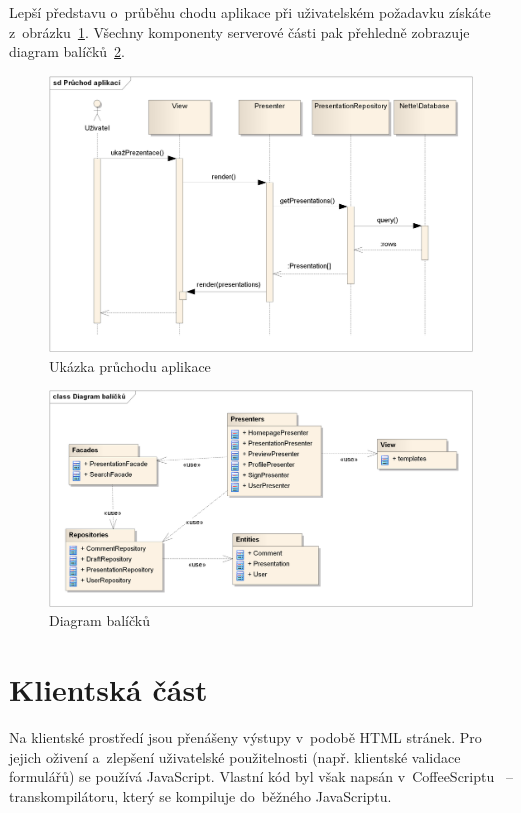 \documentclass[11pt,twoside,a4paper]{book}
\begin{document}
Lepší představu o~průběhu chodu aplikace při uživatelském požadavku získáte z~obrázku~\ref{fig:logika}. Všechny komponenty serverové části pak přehledně zobrazuje diagram balíčků~\ref{fig:balicky}.


\begin{figure}[ht]
	\begin{center}
		\includegraphics[width=14cm]{PRO-img/logika.png}
		\caption{Ukázka průchodu aplikace}
		\label{fig:logika}
	\end{center}
\end{figure}

\begin{figure}[ht]
	\begin{center}
		\includegraphics[width=14cm]{PRO-img/balicky.png}
		\caption{Diagram balíčků}
		\label{fig:balicky}
	\end{center}
\end{figure}


\section{Klientská část}
Na klientské prostředí jsou přenášeny výstupy v~podobě HTML stránek. Pro jejich oživení a~zlepšení uživatelské použitelnosti (např. klientské validace formulářů) se používá Java\-Script. Vlastní kód byl však napsán v~CoffeeScriptu~\cite{coffee} – transkompilátoru, který se kompiluje do~běžného Java\-Scriptu. 
\end{document}
